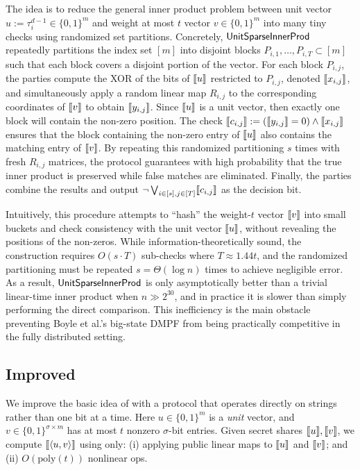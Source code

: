 The idea is to reduce the general inner product problem between unit vector $u:=\tau^{d-1}_i\in \{0,1\}^m$ and weight at most $t$ vector $v\in \{0,1\}^m$ into many tiny checks using randomized 
set partitions. Concretely, $\mathsf{UnitSparseInnerProd}$ repeatedly partitions the index set $[m]$ into disjoint 
blocks $P_{i,1},\dots,P_{i,T}\subset [m]$ such that each block covers a disjoint portion of the vector. 
For each block $P_{i,j}$, the parties compute the XOR of the bits of $\share{u}$ restricted to 
$P_{i,j}$, denoted $\share{x_{i,j}}$, and simultaneously apply a random linear map $R_{i,j}$ 
to the corresponding coordinates of $\share{v}$ to obtain $\share{y_{i,j}}$. Since $\share{u}$ 
is a unit vector, then exactly one block will contain the non-zero position. The check 
$\share{c_{i,j}} := (\share{y_{i,j}}=0) \wedge \share{x_{i,j}}$ ensures that the block 
containing the non-zero entry of $\share{u}$ also contains the matching entry of $\share{v}$. 
By repeating this randomized partitioning $s$ times with fresh $R_{i,j}$ matrices, the 
protocol guarantees with high probability that the true inner product is preserved while 
false matches are eliminated. Finally, the parties combine the results and output 
$\neg \bigvee_{i\in[s],j\in[T]} \share{c_{i,j}}$ as the decision bit.

Intuitively, this procedure attempts to ``hash'' the weight-$t$ vector $\share{v}$ into 
small buckets and check consistency with the unit vector $\share{u}$, without revealing 
the positions of the non-zeros. While information-theoretically sound, the construction 
requires $O(s \cdot T)$ sub-checks where $T\approx 1.44t$, and the randomized partitioning 
must be repeated $s=\Theta(\log n)$ times to achieve negligible error. As a result, 
$\mathsf{UnitSparseInnerProd}$ is only asymptotically better than a trivial linear-time inner product when 
$n \gg 2^{30}$, and in practice it is slower than simply performing the direct comparison. 
This inefficiency is the main obstacle preventing Boyle et al.'s big-state DMPF from being 
practically competitive in the fully distributed setting.






\subsection{Improved \SharedIPD}

We improve the basic idea of \cite{dmpf} with a protocol that operates
directly on strings rather than one bit at a time.
Here $u\in\{0,1\}^m$ is a \emph{unit} vector, and
$v\in \{0,1\}^{\sigma \times m}$ has at most $t$ nonzero
$\sigma$-bit entries. Given secret shares $\share{u},\share{v}$,
we compute $\share{\langle u,v\rangle}$ using only:
(i) applying public linear maps to $\share{u}$ and $\share{v}$; and (ii) $O(\mathrm{poly}(t))$ nonlinear ops.


